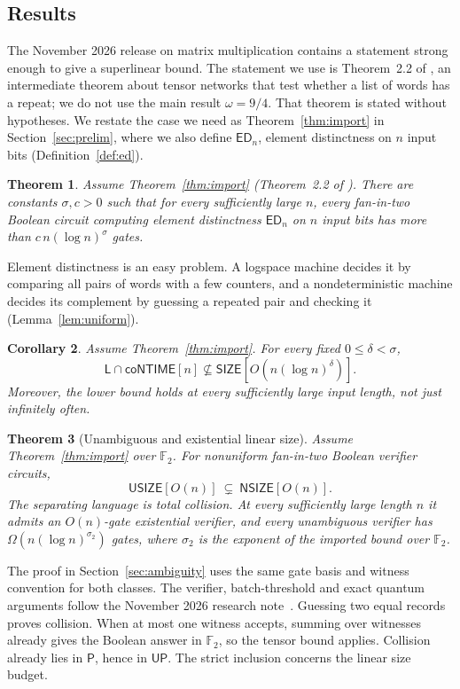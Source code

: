 \documentclass[11pt]{article}
\newtheorem{theorem}{Theorem}[section]
\newtheorem{corollary}[theorem]{Corollary}
\theoremstyle{definition}
\theoremstyle{remark}
\newcommand{\ED}{\mathsf{ED}}
\newcommand{\F}{\mathbb{F}}
\newcommand{\SIZE}{\mathsf{SIZE}}
\newcommand{\USIZE}{\mathsf{USIZE}}
\newcommand{\NSIZE}{\mathsf{NSIZE}}
\newcommand{\coNTIME}{\mathsf{coNTIME}}
\newcommand{\Lclass}{\mathsf{L}}
\begin{document}
\subsection{Results}
The November 2026 release on matrix multiplication \cite{OAI}
contains a statement strong enough to give a superlinear bound. The
statement we use is Theorem~2.2 of \cite{OAI}, an intermediate theorem
about tensor networks that test whether a list of words has a repeat; we
do not use the main result $\omega=9/4$. That theorem is stated without
hypotheses. We restate the case we need as Theorem~\ref{thm:import} in
Section~\ref{sec:prelim}, where we also define $\ED_n$, element
distinctness on $n$ input bits (Definition~\ref{def:ed}).

\begin{theorem}\label{thm:main}
Assume Theorem~\ref{thm:import} (Theorem~2.2 of \cite{OAI}). There are
constants $\sigma,c>0$ such that for every sufficiently large $n$, every
fan-in-two Boolean circuit computing element distinctness $\ED_n$ on $n$
input bits has more than $c\,n(\log n)^{\sigma}$ gates.
\end{theorem}

Element distinctness is an easy problem. A logspace machine decides it
by comparing all pairs of words with a few counters, and a
nondeterministic machine decides its complement by guessing a repeated
pair and checking it (Lemma~\ref{lem:uniform}).

\begin{corollary}\label{cor:classes}
Assume Theorem~\ref{thm:import}. For every fixed $0\le\delta<\sigma$,
\[
\Lclass\cap\coNTIME[n]\not\subseteq\SIZE[O(n(\log n)^{\delta})].
\]
Moreover, the lower bound holds at every sufficiently large input length,
not just infinitely often.
\end{corollary}

\begin{theorem}[Unambiguous and existential linear size]\label{thm:strict-verification}
Assume Theorem~\ref{thm:import} over $\F_2$. For nonuniform fan-in-two
Boolean verifier circuits,
\[
                  \USIZE[O(n)]\ \subsetneq\ \NSIZE[O(n)] .
\]
The separating language is total collision. At every sufficiently
large length $n$ it admits an $O(n)$-gate existential verifier, and
every unambiguous verifier has $\Omega(n(\log n)^{\sigma_2})$ gates,
where $\sigma_2$ is the exponent of the imported bound over $\F_2$.
\end{theorem}

The proof in Section~\ref{sec:ambiguity} uses the same gate basis and
witness convention for both classes. The verifier, batch-threshold
and exact quantum arguments follow the November 2026 research
note~\cite{VerificationNote}. Guessing two equal records proves
collision. When at most one witness accepts, summing over witnesses
already gives the Boolean answer in $\F_2$, so the tensor bound applies.
Collision already lies in $\mathsf P$, hence in $\mathsf{UP}$.
The strict inclusion concerns the linear size budget.
\end{document}
